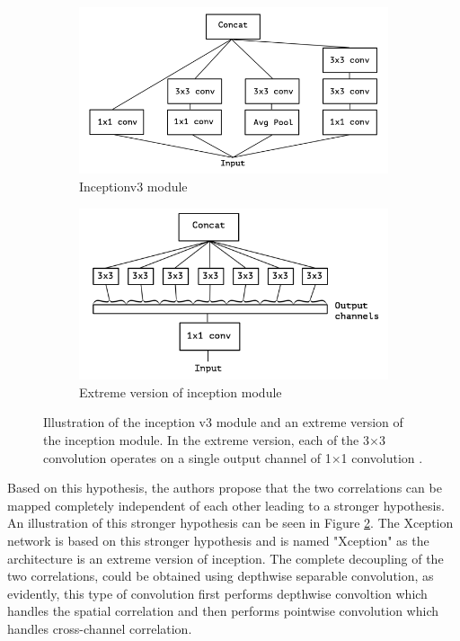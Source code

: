 	\begin{figure}
		\begin{subfigure}{.5\textwidth}
			\centering
			\includegraphics[width=1\linewidth]{images/inception_v3}
			\caption{Inceptionv3 module}
			\label{Fig:xceptiona}
		\end{subfigure}
		\begin{subfigure}{.5\textwidth}
			\centering
			\includegraphics[width=1\linewidth]{images/extreme_inception}
			\caption{Extreme version of inception module}
			\label{Fig:xceptionb}
		\end{subfigure}
		\caption{Illustration of the inception v3 module and an extreme version of the inception module. In the extreme version, each of the 3$\times$3 convolution operates on a single output channel of 1$\times$1 convolution \cite{DBLP:journals/corr/Chollet16a}.}
		\label{Fig:xception}
	\end{figure}

Based on this hypothesis, the authors propose that the two correlations can be mapped completely independent of each other leading to a stronger hypothesis. An illustration of this stronger hypothesis can be seen in Figure \ref{Fig:xceptionb}. The Xception network is based on this stronger hypothesis and is named "Xception" as the architecture is an extreme version of inception. The complete decoupling of the two correlations, could be obtained using depthwise separable convolution, as evidently, this type of convolution first performs depthwise convoltion which handles the spatial correlation and then performs pointwise convolution which handles cross-channel correlation.

